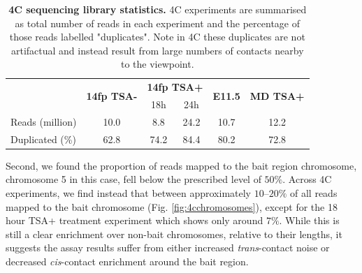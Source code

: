 \documentclass[a4paper,11pt,oneside]{book}
\begin{document}
\begin{table}[]
\centering
\caption[4C sequencing library statistics.]{ {\bf 4C sequencing library statistics.}
4C experiments are summarised as total number of reads in each experiment and the percentage of those reads labelled "duplicates". Note in 4C these duplicates are not artifactual and instead result from large numbers of contacts nearby to the viewpoint.
}
\label{tab:4c}
\begin{tabular}{l|c|cc|c|c|}
\cline{2-6}
                                      & \multirow{2}{*}{{\bf 14fp TSA-}} & \multicolumn{2}{c|}{{\bf 14fp TSA+}} & \multirow{2}{*}{{\bf E11.5}} & \multirow{2}{*}{{\bf MD TSA+}} \\
                                      &                                  & 18h               & 24h              &                              &                                \\ \hline
\multicolumn{1}{|l|}{Reads (million)} & 10.0                             & 8.8               & 24.2             & 10.7                         & 12.2                           \\
\multicolumn{1}{|l|}{Duplicated (\%)} & 62.8                             & 74.2              & 84.4             & 80.2                         & 72.8                           \\ \hline
\end{tabular}
\end{table}


Second, we found the proportion of reads mapped to the bait region chromosome, chromosome 5 in this case, fell below the prescribed level of $50\%$. Across 4C experiments, we find instead that between approximately $10$--$20\%$ of all reads mapped to the bait chromosome (Fig. \ref{fig:4cchromosomes}), except for  the 18 hour TSA+ treatment experiment which shows only around $7\%$. While this is still a clear enrichment over non-bait chromosomes, relative to their lengths, it suggests the assay results suffer from either increased \emph{trans}-contact noise or decreased \emph{cis}-contact enrichment around the bait region. 
\end{document}
